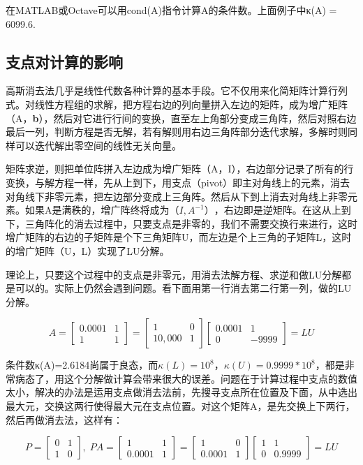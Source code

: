 在MATLAB或Octave可以用cond(A)指令计算A的条件数。上面例子中κ(A) = 6099.6.

\subsection{支点对计算的影响}

高斯消去法几乎是线性代数各种计算的基本手段。它不仅用来化简矩阵计算行列式。对线性方程组的求解，把方程右边的列向量拼入左边的矩阵，成为增广矩阵（A，\textbf{b}），然后对它进行行间的变换，直至左上角部分变成三角阵，然后对照右边最后一列，判断方程是否无解，若有解则用右边三角阵部分迭代求解，多解时则同样可以迭代解出零空间的线性无关向量。

矩阵求逆，则把单位阵拼入左边成为增广矩阵（A，I），右边部分记录了所有的行变换，与解方程一样，先从上到下，用支点（pivot）即主对角线上的元素，消去对角线下非零元素，把左边部分变成上三角阵。然后从下到上消去对角线上非零元素。如果A是满秩的，增广阵终将成为$ （I, A^{-1}） $，右边即是逆矩阵。在这从上到下，三角阵化的消去过程中，只要支点是非零的，我们不需要交换行来进行，这时增广矩阵的右边的子矩阵是个下三角矩阵U，而左边是个上三角的子矩阵L，这时的增广矩阵（U，L）实现了LU分解。

理论上，只要这个过程中的支点是非零元，用消去法解方程、求逆和做LU分解都是可以的。实际上仍然会遇到问题。看下面用第一行消去第二行第一列，做的LU分解。

\[A=\begin{bmatrix} 0.0001&1\\ 1&1 \end{bmatrix}=\begin{bmatrix} 1&0\\ 10,000&1 \end{bmatrix}\begin{bmatrix} 0.0001&1\\ 0&-9999 \end{bmatrix}=LU\]

条件数κ(A)=2.6184尚属于良态，而$ κ(L) =10^{8}，κ(U) =0.9999*10^{8} $，都是非常病态了，用这个分解做计算会带来很大的误差。问题在于计算过程中支点的数值太小，解决的办法是运用支点做消去法前，先搜寻支点所在位置及下面，从中选出最大元，交换这两行使得最大元在支点位置。对这个矩阵A，是先交换上下两行，然后再做消去法，这样有：

\[P=\begin{bmatrix} 0&1\\1&0\end{bmatrix},\;PA=\begin{bmatrix} 1&1\\0.0001&1 \end{bmatrix}=\begin{bmatrix}1&0\\0.0001&1\end{bmatrix}\begin{bmatrix} 1&1\\ 0&0.9999 \end{bmatrix}=LU\]

